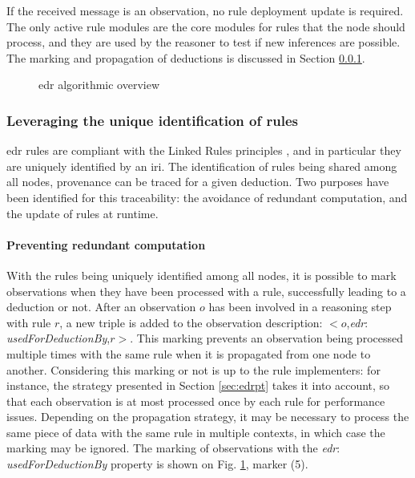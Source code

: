 \documentclass{iosart2c}
\newcommand{\namespace}[1]{\textit{#1$:$}}
\newcommand{\concept}[2]{\namespace{#1}\-\textit{#2}}
\newcommand{\triplet}[3]{$<$#1,\textit{#2},#3$>$}
\begin{document}
If the received message is an observation, no rule deployment update is required. 
The only active rule modules are the core modules for rules that the node should process, and they are used by the reasoner to test if new inferences are possible.
The marking and propagation of deductions is discussed in Section \textsection \ref{subsubs:unique_identification}.

\begin{figure}
	\centering
	\caption{\gls{edr} algorithmic overview}
	\label{fig:edr_algo}
	\scalebox{0.7}{
			
	}
\end{figure}

\subsubsection{Leveraging the unique identification of rules}
\label{subsubs:unique_identification}

\gls{edr} rules are compliant with the Linked Rules principles \cite{Khandelwal2011}, and in particular they are uniquely identified by an \gls{iri}.
The identification of rules being shared among all nodes, provenance can be traced for a given deduction.
Two purposes have been identified for this traceability: the avoidance of redundant computation, and the update of rules at runtime.

\paragraph{Preventing redundant computation} 

With the rules being uniquely identified among all nodes, it is possible to mark observations when they have been processed with a rule, successfully leading to a deduction or not.
After an observation $o$ has been involved in a reasoning step with rule $r$, a new triple is added to the observation description: \triplet{$o$}{\concept{edr}{used\-For\-Deduction\-By}}{$r$}.
This marking prevents an observation being processed multiple times with the same rule when it is propagated from one node to another.
Considering this marking or not is up to the rule implementers: for instance, the strategy presented in Section \textsection \ref{sec:edrpt} takes it into account, so that each observation is at most processed once by each rule for performance issues.
Depending on the propagation strategy, it may be necessary to process the same piece of data with the same rule in multiple contexts, in which case the marking may be ignored.
The marking of observations with the \concept{edr}{used\-For\-Deduction\-By} property is shown on Fig. \ref{fig:edr_algo}, marker (5).
\end{document}
